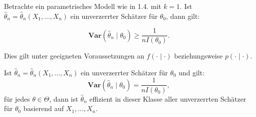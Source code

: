 \documentclass[10pt]{article}
\newcommand{\FZV}{X_1, \ldots, X_n} %
\begin{document}
	\begin{Satz}
	
	Betrachte ein parametrisches Modell wie in 1.4. mit $k = 1$. Ist $\hat{\theta}_n = \hat{\theta}_n \left(\FZV \right)$ ein unverzerrter Schätzer für $\theta_0$, dann gilt:
	
	\begin{equation*}
		\textbf{Var}(\hat{\theta}_n \mid \theta_0) \geq \frac{1}{nI(\theta_0)}.
	\end{equation*}
	
	Dies gilt unter geeigneten Voraussetzungen an $f(\cdot \mid \cdot)$ beziehungsweise $p(\cdot \mid \cdot)$. 
	\end{Satz}
	
	\begin{Korollar}[Korollar]
			Ist $\hat{\theta}_n = \hat{\theta}_n (\FZV)$ ein unverzerrter Schätzer für $\theta_0$ und gilt:
		\begin{equation*}
			\textbf{Var}(\hat{\theta}_n \mid \theta_0) = \frac{1}{nI(\theta_0)},
		\end{equation*}
		für jedes $\theta \in \Theta $, dann ist $\hat{\theta}_n$ effizient in dieser Klasse aller unverzerrten Schätzer für $\theta_0$ basierend auf $\FZV$.
	\end{Korollar}
\end{document}
